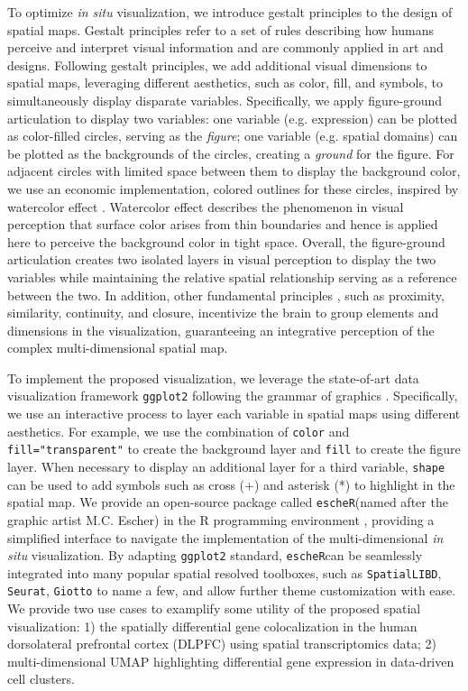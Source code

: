 \documentclass[11pt]{article}
\newcommand{\coloc}{\texttt{escheR}}
\begin{document}
 To optimize \textit{in situ} visualization, we introduce gestalt principles to the design of spatial maps. Gestalt principles \cite{todorovic_2008, palmer_1999} refer to a set of rules describing how humans perceive and interpret visual information and are commonly applied in art and designs. Following gestalt principles, we add additional visual dimensions to spatial maps, leveraging different aesthetics, such as color, fill, and symbols, to simultaneously display disparate variables. Specifically, we apply figure-ground articulation to display two variables: one variable (e.g. expression) can be plotted as color-filled circles, serving as the \textit{figure}; one variable (e.g. spatial domains) can be plotted as the backgrounds of the circles, creating a \textit{ground} for the figure. For adjacent circles with limited space between them to display the background color, we use an economic implementation, colored outlines for these circles, inspired by watercolor effect \cite{pinna_1987, pinna_2001}. Watercolor effect describes the phenomenon in visual perception that surface color arises from thin boundaries and hence is applied here to perceive the background color in tight space. Overall, the figure-ground articulation creates two isolated layers in visual perception to display the two variables while maintaining the relative spatial relationship serving as a reference between the two. In addition, other fundamental principles \cite{todorovic_2008}, such as proximity, similarity, continuity, and closure, incentivize the brain to group elements and dimensions in the visualization, guaranteeing an integrative perception of the complex multi-dimensional spatial map.
 

To implement the proposed visualization, we leverage the state-of-art data visualization framework \texttt{ggplot2} \cite{ggplot2} following the grammar of graphics \cite{wilkinson_2012}. Specifically, we use an interactive process to layer each variable in spatial maps using different aesthetics. For example, we use the combination of \texttt{color} and \texttt{fill="transparent"} to create the background layer and \texttt{fill} to create the figure layer. When necessary to display an additional layer for a third variable, \texttt{shape} can be used to add symbols such as cross (+) and asterisk (*) to highlight in the spatial map. We provide an open-source package called \coloc (named after the graphic artist M.C. Escher) in the R programming environment \cite{R}, providing a simplified interface to navigate the implementation of the multi-dimensional \textit{in situ} visualization. By adapting \texttt{ggplot2} standard, \coloc can be seamlessly integrated into many popular spatial resolved toolboxes, such as \texttt{SpatialLIBD}\cite{pardo_2022}, \texttt{Seurat}\cite{hao_2021}, \texttt{Giotto} \cite{dries_2021} to name a few, and allow further theme customization with ease. We provide two use cases to examplify some utility of the proposed spatial visualization: 1) the spatially differential gene colocalization in the human dorsolateral prefrontal cortex (DLPFC) using spatial transcriptomics data; 2) multi-dimensional UMAP highlighting differential gene expression in data-driven cell clusters. 
\end{document}
